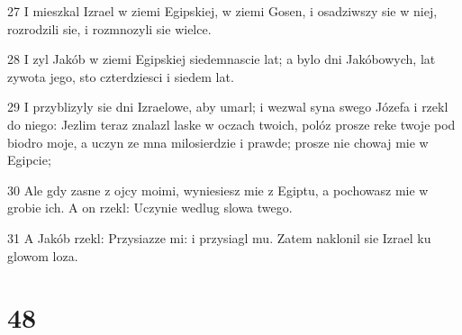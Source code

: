 \par 27 I mieszkal Izrael w ziemi Egipskiej, w ziemi Gosen, i osadziwszy sie w niej, rozrodzili sie, i rozmnozyli sie wielce.
\par 28 I zyl Jakób w ziemi Egipskiej siedemnascie lat; a bylo dni Jakóbowych, lat zywota jego, sto czterdziesci i siedem lat.
\par 29 I przyblizyly sie dni Izraelowe, aby umarl; i wezwal syna swego Józefa i rzekl do niego: Jezlim teraz znalazl laske w oczach twoich, polóz prosze reke twoje pod biodro moje, a uczyn ze mna milosierdzie i prawde; prosze nie chowaj mie w Egipcie;
\par 30 Ale gdy zasne z ojcy moimi, wyniesiesz mie z Egiptu, a pochowasz mie w grobie ich. A on rzekl: Uczynie wedlug slowa twego.
\par 31 A Jakób rzekl: Przysiazze mi: i przysiagl mu. Zatem naklonil sie Izrael ku glowom loza.

\chapter{48}

